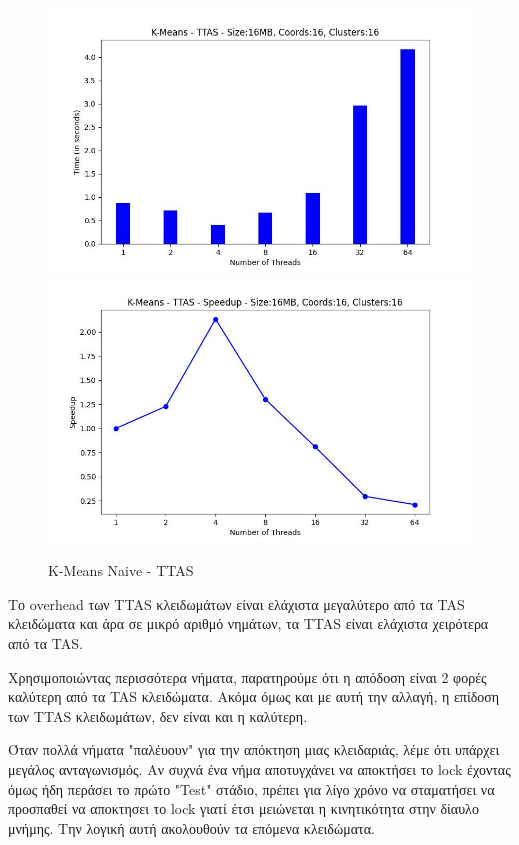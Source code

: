 \documentclass[../final_report.tex]{subfiles}
\begin{document}
\begin{figure}[H]
    \centering
        \includegraphics[scale=0.4]{outFilesAffinityMouliko/plots/kmeans_locks_ttas.jpg}
        \includegraphics[scale=0.4]{outFilesAffinityMouliko/plots/kmeans_locks_ttas_speedup.jpg}
    \caption{K-Means Naive - TTAS}
    \label{fig:K-Means Naive - TTAS}
\end{figure}

Το overhead των TTAS κλειδωμάτων είναι ελάχιστα μεγαλύτερο από τα TAS κλειδώματα και άρα σε 
μικρό αριθμό νημάτων, τα TTAS είναι ελάχιστα χειρότερα από τα TAS.

Χρησιμοποιώντας περισσότερα νήματα, παρατηρούμε ότι η απόδοση είναι 2 φορές καλύτερη από τα 
TAS κλειδώματα. Ακόμα όμως και με αυτή την αλλαγή, η επίδοση των TTAS κλειδωμάτων, δεν είναι και η
καλύτερη. 

Όταν πολλά νήματα "παλέυουν" για την απόκτηση μιας κλειδαριάς, λέμε ότι υπάρχει μεγάλος ανταγωνισμός.
Αν συχνά ένα νήμα αποτυγχάνει να αποκτήσει το lock έχοντας όμως ήδη περάσει το πρώτο "Test" στάδιο,
πρέπει για λίγο χρόνο να σταματήσει να προσπαθεί να αποκτησει το lock γιατί έτσι μειώνεται η 
κινητικότητα στην δίαυλο μνήμης. Την λογική αυτή ακολουθούν τα επόμενα κλειδώματα.
\end{document}
